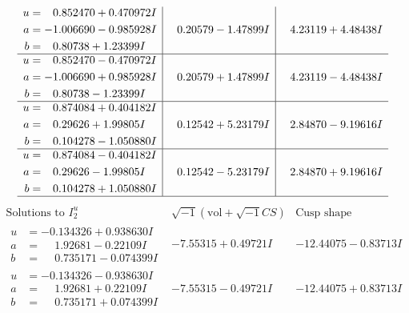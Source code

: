 \documentclass[1p]{elsarticle_modified}
\theoremstyle{definition}
\newcommand{\I}{\sqrt{-1}}
\begin{document}
$$\begin{array}{c|c|c}
\begin{aligned}
u &= \phantom{-}0.852470 + 0.470972 I \\
a &= -1.006690 - 0.985928 I \\
b &= \phantom{-}0.80738 + 1.23399 I\end{aligned}
 & \phantom{-}0.20579 - 1.47899 I & \phantom{-}4.23119 + 4.48438 I \\ \hline\begin{aligned}
u &= \phantom{-}0.852470 - 0.470972 I \\
a &= -1.006690 + 0.985928 I \\
b &= \phantom{-}0.80738 - 1.23399 I\end{aligned}
 & \phantom{-}0.20579 + 1.47899 I & \phantom{-}4.23119 - 4.48438 I \\ \hline\begin{aligned}
u &= \phantom{-}0.874084 + 0.404182 I \\
a &= \phantom{-}0.29626 + 1.99805 I \\
b &= \phantom{-}0.104278 - 1.050880 I\end{aligned}
 & \phantom{-}0.12542 + 5.23179 I & \phantom{-}2.84870 - 9.19616 I \\ \hline\begin{aligned}
u &= \phantom{-}0.874084 - 0.404182 I \\
a &= \phantom{-}0.29626 - 1.99805 I \\
b &= \phantom{-}0.104278 + 1.050880 I\end{aligned}
 & \phantom{-}0.12542 - 5.23179 I & \phantom{-}2.84870 + 9.19616 I\\
 \hline 
 \end{array}$$\newpage$$\begin{array}{c|c|c}  
\text{Solutions to }I^u_{2}& \I (\text{vol} + \sqrt{-1}CS) & \text{Cusp shape}\\
 \hline 
\begin{aligned}
u &= -0.134326 + 0.938630 I \\
a &= \phantom{-}1.92681 - 0.22109 I \\
b &= \phantom{-}0.735171 - 0.074399 I\end{aligned}
 & -7.55315 + 0.49721 I & -12.44075 - 0.83713 I \\ \hline\begin{aligned}
u &= -0.134326 - 0.938630 I \\
a &= \phantom{-}1.92681 + 0.22109 I \\
b &= \phantom{-}0.735171 + 0.074399 I\end{aligned}
 & -7.55315 - 0.49721 I & -12.44075 + 0.83713 I \\ \hline\begin{aligned}

\end{aligned}
\end{array}$$
\end{document}

